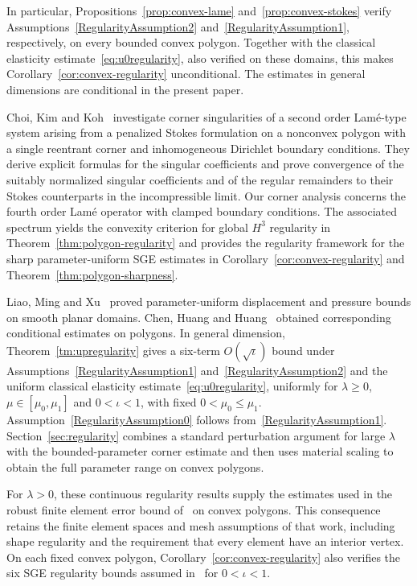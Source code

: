 \documentclass[10pt]{amsart}
\numberwithin{equation}{section}
\begin{document}
In particular, Propositions~\ref{prop:convex-lame} and~\ref{prop:convex-stokes} verify Assumptions~\ref{RegularityAssumption2} and~\ref{RegularityAssumption1}, respectively, on every bounded convex polygon. Together with the classical elasticity estimate~\eqref{eq:u0regularity}, also verified on these domains, this makes Corollary~\ref{cor:convex-regularity} unconditional. The estimates in general dimensions are conditional in the present paper.

Choi, Kim and Koh~\cite{ChoiKimKoh2025} investigate corner singularities of a second order Lam\'e-type system arising from a penalized Stokes formulation on a nonconvex polygon with a single reentrant corner and inhomogeneous Dirichlet boundary conditions. They derive explicit formulas for the singular coefficients and prove convergence of the suitably normalized singular coefficients and of the regular remainders to their Stokes counterparts in the incompressible limit. Our corner analysis concerns the fourth order Lam\'e operator with clamped boundary conditions. The associated spectrum yields the convexity criterion for global $H^3$ regularity in Theorem~\ref{thm:polygon-regularity} and provides the regularity framework for the sharp parameter-uniform SGE estimates in Corollary~\ref{cor:convex-regularity} and Theorem~\ref{thm:polygon-sharpness}.

Liao, Ming and Xu~\cite[Theorem~2.9]{LiaoMingXu2023} proved parameter-uniform displacement and pressure bounds on smooth planar domains. Chen, Huang and Huang~\cite[Lemma~3.8 and Theorem~3.9]{ChenHuangHuang2023} obtained corresponding conditional estimates on polygons. In general dimension, Theorem~\ref{tm:upregularity} gives a six-term $O(\sqrt\iota)$ bound under Assumptions~\ref{RegularityAssumption1} and~\ref{RegularityAssumption2} and the uniform classical elasticity estimate~\eqref{eq:u0regularity}, uniformly for $\lambda\geq0$, $\mu\in[\mu_0,\mu_1]$ and $0<\iota<1$, with fixed $0<\mu_0\leq\mu_1$. Assumption~\ref{RegularityAssumption0} follows from~\ref{RegularityAssumption1}. Section~\ref{sec:regularity} combines a standard perturbation argument for large $\lambda$ with the bounded-parameter corner estimate and then uses material scaling to obtain the full parameter range on convex polygons.

For $\lambda>0$, these continuous regularity results supply the estimates used in the robust finite element error bound of~\cite[Theorem~5.9]{ChenHuangHuang2023} on convex polygons. This consequence retains the finite element spaces and mesh assumptions of that work, including shape regularity and the requirement that every element have an interior vertex. On each fixed convex polygon, Corollary~\ref{cor:convex-regularity} also verifies the six SGE regularity bounds assumed in~\cite[Section~2.3, equations~(2.7)--(2.8)]{HuangHuangTang2026robust} for $0<\iota<1$.
\end{document}
